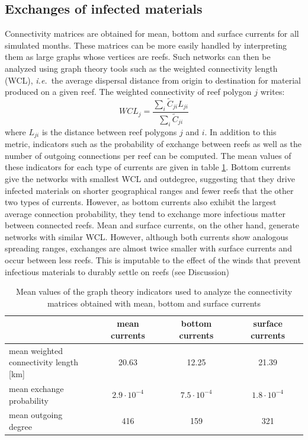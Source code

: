 \documentclass[utf8]{frontiersSCNS}
\newcommand{\ie}{{\it i.e.}\ }
\begin{document}
\subsection{Exchanges of infected materials}
Connectivity matrices are obtained for mean, bottom and surface currents for all simulated months. These matrices can be more easily handled by interpreting them as large graphs whose vertices are reefs. Such networks can then be analyzed using graph theory tools such as the weighted connectivity length (WCL), \ie the average dispersal distance from origin to destination for material produced on a given reef. The weighted connectivity of reef polygon $j$ writes:
\begin{equation}
    WCL_j = \dfrac{\sum_i \tilde{C}_{ji} L_{ji}}{\sum_i \tilde{C}_{ji}}
\end{equation}
where $L_{ji}$ is the distance between reef polygons $j$ and $i$. In addition to this metric, indicators such as the probability of exchange between reefs as well as the number of outgoing connections per reef can be computed. The mean values of these indicators for each type of currents are given in table \ref{tab:connect}. Bottom currents give the networks with smallest WCL and outdegree, suggesting that they drive infected materials on shorter geographical ranges and fewer reefs that the other two types of currents. However, as bottom currents also exhibit the largest average connection probability, they tend to exchange more infectious matter between connected reefs. Mean and surface currents, on the other hand, generate networks with similar WCL. However, although both currents show analogous spreading ranges, exchanges are almost twice smaller with surface currents and occur between less reefs.  This is imputable to the effect of the winds that prevent infectious materials to durably settle on reefs (see Discussion)

\begin{table}
    \centering
    \begin{tabular}{|l|c|c|c|}
        \hline
                                   & mean currents      & bottom currents    & surface currents   \\
        \hline
        \makecell{mean weighted \\
        connectivity length [km]}  & 20.63              & 12.25              & 21.39              \\
        \hline
        \makecell{mean exchange 
        \\probability}             & $2.9\cdot 10^{-4}$ & $7.5\cdot 10^{-4}$ & $1.8\cdot 10^{-4}$ \\
        \hline
        \makecell{mean outgoing \\
        degree}                    & 416                & 159                & 321 \\
        \hline
    \end{tabular}
    \caption{Mean values of the graph theory indicators used to analyze the connectivity matrices obtained with mean, bottom and surface currents}
    \label{tab:connect}
\end{table}
\end{document}
